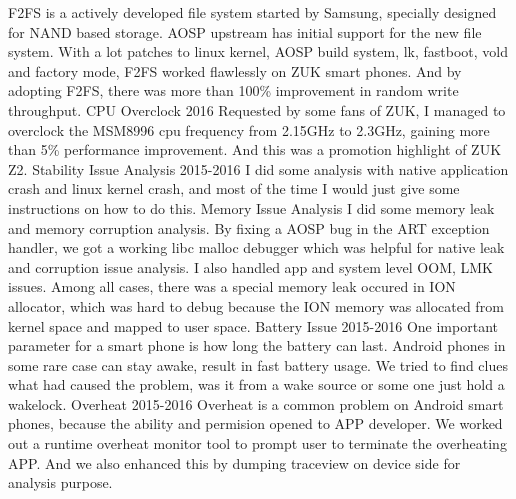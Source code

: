 \begin{cventries}
{\begin{cvsubentries}
          {F2FS is a actively developed file system started by Samsung, specially designed for NAND based storage. AOSP upstream has initial support for the new file system. With a lot patches to linux kernel, AOSP build system, lk, fastboot, vold and factory mode, F2FS worked flawlessly on ZUK smart phones. And by adopting F2FS, there was more than 100\% improvement in random write throughput.}
        \cvsubentry
          {}
          {CPU Overclock}
          {2016}
          {Requested by some fans of ZUK, I managed to overclock the MSM8996 cpu frequency from 2.15GHz to 2.3GHz, gaining more than 5\% performance improvement. And this was a promotion highlight of ZUK Z2.}
        \cvsubentry
          {}
          {Stability Issue Analysis}
          {2015-2016}
          {I did some analysis with native application crash and linux kernel crash, and most of the time I would just give some instructions on how to do this.}
        \cvsubentry
          {}
          {Memory Issue Analysis}
          {}
          {I did some memory leak and memory corruption analysis. By fixing a AOSP bug in the ART exception handler, we got a working libc malloc debugger which was helpful for native leak and corruption issue analysis. I also handled app and system level OOM, LMK issues. Among all cases, there was a special memory leak occured in ION allocator, which was hard to debug because the ION memory was allocated from kernel space and mapped to user space.}
        \cvsubentry
          {}
          {Battery Issue}
          {2015-2016}
          {One important parameter for a smart phone is how long the battery can last. Android phones in some rare case can stay awake, result in fast battery usage. We tried to find clues what had caused the problem, was it from a wake source or some one just hold a wakelock.}
        \cvsubentry
          {}
          {Overheat}
          {2015-2016}
          {Overheat is a common problem on Android smart phones, because the ability and permision opened to APP developer. We worked out a runtime overheat monitor tool to prompt user to terminate the overheating APP. And we also enhanced this by dumping traceview on device side for analysis purpose.}
      \end{cvsubentries}
    }


\end{cventries}
